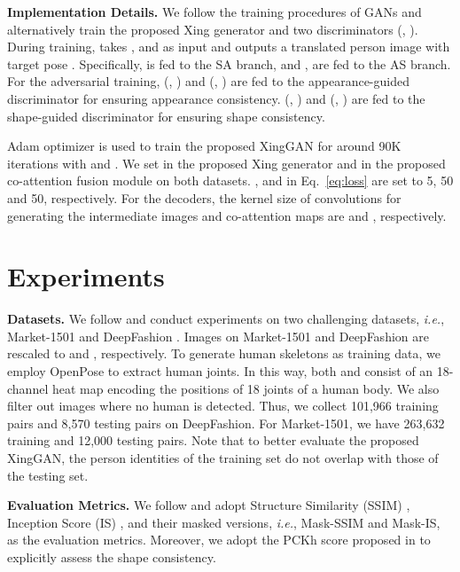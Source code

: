 \documentclass[runningheads]{llncs}
\begin{document}
\noindent \textbf{Implementation Details.}
We follow the training procedures of GANs and alternatively train the proposed Xing generator  and two discriminators (, ).
During training,  takes ,  and  as input and outputs a translated person image  with target pose .
Specifically,  is fed to the SA branch, and ,  are fed to the AS branch.
For the adversarial training, (, ) and (, ) are fed to the appearance-guided discriminator  for ensuring appearance consistency.
(, ) and (, ) are fed to the shape-guided discriminator  for ensuring shape consistency.

Adam optimizer \cite{kingma2014adam} is used to train the proposed XingGAN for around 90K iterations with  and .
We set  in the proposed Xing generator and  in the proposed co-attention fusion module on both datasets.
,  and  in Eq.~\eqref{eq:loss} are set to 5, 50 and 50, respectively.
For the decoders, the kernel size of convolutions for generating the intermediate images and co-attention maps are  and , respectively.
 \section{Experiments}

\noindent \textbf{Datasets.}
We follow \cite{ma2017pose,siarohin2018deformable,zhu2019progressive} and conduct experiments on two challenging datasets, \emph{i.e.}, Market-1501 \cite{zheng2015scalable} and DeepFashion \cite{liu2016deepfashion}.
Images on Market-1501 and DeepFashion are rescaled to  and , respectively.
To generate human skeletons as training data, we employ OpenPose \cite{cao2017realtime} to extract human joints. 
In this way, both  and  consist of an 18-channel heat map encoding the positions of 18 joints of a human body.
We also filter out images where no human is detected.
Thus, we collect 101,966 training pairs and 8,570 testing pairs on DeepFashion.
For Market-1501, we have 263,632 training and 12,000 testing pairs. 
Note that to better evaluate the proposed XingGAN, the person identities of the training set do not overlap with those of the testing set.

\noindent \textbf{Evaluation Metrics.}
We follow \cite{ma2017pose,siarohin2018deformable,zhu2019progressive} and adopt Structure Similarity (SSIM) \cite{wang2004image}, Inception Score (IS) \cite{salimans2016improved}, and their masked versions, \emph{i.e.}, Mask-SSIM and Mask-IS, as the evaluation metrics.
Moreover, we adopt the PCKh score proposed in \cite{zhu2019progressive} to explicitly assess the shape consistency.
\end{document}
